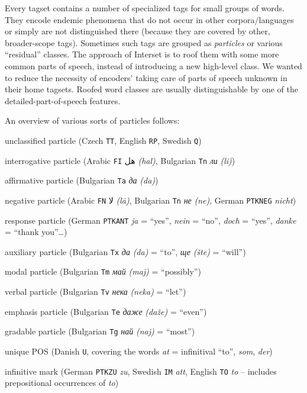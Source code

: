\documentclass[11pt]{article}
\newcommand{\ar}[1]{{\arfont #1}}
\newcommand{\translit}[1]{{\translitfont \textit{(#1)}}}
\begin{document}
Every tagset contains a number of specialized tags for small groups of words. They encode endemic phenomena that do not occur in other corpora/languages or simply are not distinguished there (because they are covered by other, broader-scope tags). Sometimes such tags are grouped as \textit{particles} or various ``residual'' classes. The approach of Interset is to roof them with some more common parts of speech, instead of introducing a new high-level class. We wanted to reduce the necessity of encoders’ taking care of parts of speech unknown in their home tagsets. Roofed word classes are usually distinguishable by one of the detailed-part-of-speech features.

An overview of various sorts of particles follows:

\begin{compactitem}
\item unclassified particle (Czech \texttt{TT}, English \texttt{RP}, Swedish \texttt{Q})
\item interrogative particle (Arabic \texttt{FI} \ar{هل} \translit{hal}, Bulgarian \texttt{Tn} \textit{ли} \translit{li})
\item affirmative particle (Bulgarian \texttt{Ta} \textit{да} \translit{da})
\item negative particle (Arabic \texttt{FN} \ar{لا} \translit{lā}, Bulgarian \texttt{Tn} \textit{не} \translit{ne}, German \texttt{PTKNEG} \textit{nicht})
\item response particle (German \texttt{PTKANT} \textit{ja} = “yes”, \textit{nein} = “no”, \textit{doch} = “yes”, \textit{danke} = “thank you”…)
\item auxiliary particle (Bulgarian \texttt{Tx} \textit{да} \translit{da} = “to”, \textit{ще} \translit{šte} = “will”)
\item modal particle (Bulgarian \texttt{Tm} \textit{май} \translit{maj} = “possibly”)
\item verbal particle (Bulgarian \texttt{Tv} \textit{нека} \translit{neka} = “let”)
\item emphasis particle (Bulgarian \texttt{Te} \textit{даже} \translit{daže} = “even”)
\item gradable particle (Bulgarian \texttt{Tg} \textit{най} \translit{naj} = “most”)
\item unique POS (Danish \texttt{U}, covering the words \textit{at} = infinitival “to”, \textit{som}, \textit{der})
\item infinitive mark (German \texttt{PTKZU} \textit{zu}, Swedish \texttt{IM} \textit{att}, English \texttt{TO} \textit{to} – includes prepositional occurrences of \textit{to})

\end{compactitem}
\end{document}
